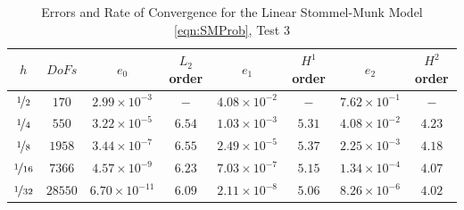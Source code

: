 \begin{table}%
\begin{center}
\begin{tabular}{|c|c|c|c|c|c|c|c|}%
  \hline
  $h$ & $DoFs$ & $e_0$ & $L_2$ order & $e_1$ & $H^1$ order & $e_2$ & $H^2$ order \\[0.2em] %
  \hline
  $\nicefrac{1}{2}$ & $170$ & $2.99\times 10^{-3}$ & $-$ & $4.08\times 10^{-2}$ & $-$ & $7.62\times 10^{-1}$ & $-$ \\[0.2em] %
  $\nicefrac{1}{4}$ & $550$ & $3.22\times 10^{-5}$ & $6.54$ & $1.03\times 10^{-3}$ & $5.31$ & $4.08\times 10^{-2}$ & $4.23$ \\[0.2em] %
  $\nicefrac{1}{8}$ & $1958$ & $3.44\times 10^{-7}$ & $6.55$ & $2.49\times 10^{-5}$ & $5.37$ & $2.25\times 10^{-3}$ & $4.18$ \\[0.2em] %
  $\nicefrac{1}{16}$ & $7366$ & $4.57\times 10^{-9}$ & $6.23$ & $7.03\times 10^{-7}$ & $5.15$ & $1.34\times 10^{-4}$ & $4.07$ \\[0.2em] %
  $\nicefrac{1}{32}$ & $28550$ & $6.70\times 10^{-11}$ & $6.09$ & $2.11\times 10^{-8}$ & $5.06$ & $8.26\times 10^{-6}$ & $4.02$ \\[0.2em] %
 \hline
\end{tabular}
\end{center}
\caption{Errors and Rate of Convergence for the Linear Stommel-Munk Model \eqref{eqn:SMProb}, Test 3 \cite{Cascon}}
\label{tab:SMsinErrors}
\end{table}

